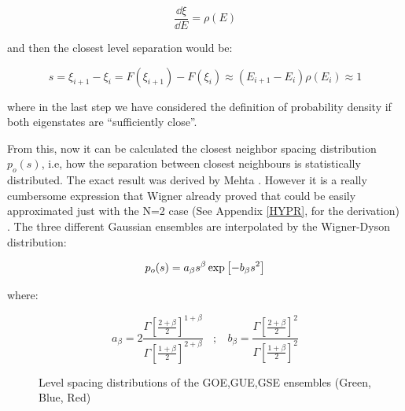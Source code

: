\documentclass[11pt,a4paper]{article}
\begin{document}
\begin{equation}
    \frac{\dd\xi}{\dd E} = \rho(E) 
\end{equation}

{\noindent and then the closest level separation would be:}

\begin{equation}
    s = \xi_{i+1}-\xi_i = F(\xi_{i+1})-F(\xi_i) \approx (E_{i+1}-E_{i})\rho(E_i) \approx 1
\end{equation}

{\noindent where in the last step we have considered the definition of probability density if both eigenstates are \textquotedblleft sufficiently close\textquotedblright.}

From this, now it can be calculated the closest neighbor spacing distribution $p_o(s)$, i.e, how the separation between closest neighbours is statistically distributed. The exact result was derived by Mehta \cite{mehta_random_2004}. However it is a really cumbersome expression that Wigner already proved that could be easily approximated just with the N=2 case (See Appendix \ref{HYPR}, for the derivation) \cite{wigner_statistical_1951}. The three different Gaussian ensembles are interpolated by the Wigner-Dyson distribution:

\begin{equation}\LA{WGDY}
    p_o(s) = a_\beta s^\beta \exp\left[-b_\beta s^2\right]
\end{equation}

{\noindent where:}

\begin{equation}
    a_\beta=2\frac{\Gamma\left[\frac{2+\beta}{2}\right]^{1+\beta}}{\Gamma\left[\frac{1+\beta}{2}\right]^{2+\beta}} ~~~~;~~~~ b_\beta=\frac{\Gamma\left[\frac{2+\beta}{2}\right]^{2}}{\Gamma\left[\frac{1+\beta}{2}\right]^{2}}
\end{equation}

\begin{figure}[h]
    \centering
        \caption{Level spacing distributions of the GOE,GUE,GSE ensembles (Green, Blue, Red)}
\end{figure}
\end{document}
